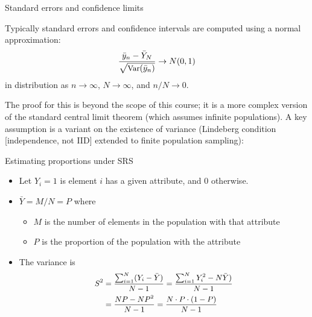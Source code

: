 \documentclass[
  ignorenonframetext,
]{beamer}
\providecommand{\tightlist}{%
  \setlength{\itemsep}{0pt}\setlength{\parskip}{0pt}}
\begin{document}
\begin{frame}{Standard errors and confidence limits}
\protect\hypertarget{standard-errors-and-confidence-limits}{}

Typically standard errors and confidence intervals are computed using a
normal approximation: \[ \small
\frac{\bar y_n - \bar Y_N}{\sqrt{\text{Var}(\bar y_n)}} \to N(0,1)
\] in distribution as \(n \to \infty\), \(N \to \infty\), and
\(n/N \to 0\).

The proof for this is beyond the scope of this course; it is a more
complex version of the standard central limit theorem (which assumes
infinite populations). A key assumption is a variant on the existence of
variance (Lindeberg condition {[}independence, not IID{]} extended to
finite population sampling):

\end{frame}

\begin{frame}{Estimating proportions under SRS}
\protect\hypertarget{estimating-proportions-under-srs}{}

\begin{itemize}
\tightlist
\item
  Let \(Y_i = 1\) is element \(i\) has a given attribute, and \(0\)
  otherwise.
\item
  \(\bar Y = M/N=P\) where

  \begin{itemize}
  \tightlist
  \item
    \(M\) is the number of elements in the population with that
    attribute
  \item
    \(P\) is the proportion of the population with the attribute
  \end{itemize}
\item
  The variance is \[ \small
  \begin{aligned}
  S^2 &= \frac{\sum_{i=1}^N (Y_i - \bar Y)}{N-1} = \frac{\sum_{i=1}^N Y_i^2 - N\bar Y)}{N-1} \\
  &= \frac{NP - NP^2}{N-1} = \frac{N \cdot P \cdot (1-P)}{N-1}
  \end{aligned}
  \]
\end{itemize}

\end{frame}
\end{document}
